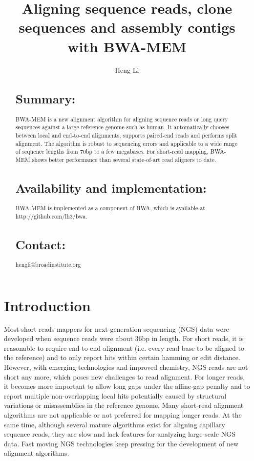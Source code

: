 \documentclass{bioinfo}
\begin{document}

\title{Aligning sequence reads, clone sequences and assembly contigs with BWA-MEM}

\author[Li]{Heng Li}

\address{Broad Institute of Harvard and MIT, 7 Cambridge Center, Cambridge, MA 02142, USA}

\maketitle

\begin{abstract}
\section{Summary:} BWA-MEM is a new alignment algorithm for aligning sequence
reads or long query sequences against a large reference genome such as human.
It automatically chooses between local and end-to-end alignments, supports
paired-end reads and performs split alignment. The algorithm is robust to
sequencing errors and applicable to a wide range of sequence lengths from 70bp
to a few megabases. For short-read mapping, BWA-MEM shows better performance
than several state-of-art read aligners to date.

\section{Availability and implementation:} BWA-MEM is implemented as a
component of BWA, which is available at http://github.com/lh3/bwa.

\section{Contact:} hengli@broadinstitute.org
\end{abstract}

\section{Introduction}

Most short-reads mappers for next-generation sequencing (NGS) data were
developed when sequence reads were about 36bp in length. For short reads, it is
reasonable to require end-to-end alignment (i.e. every read base to be aligned
to the reference) and to only report hits within certain hamming or edit
distance.  However, with emerging technologies and improved chemistry, NGS
reads are not short any more, which poses new challenges to read alignment. For
longer reads, it becomes more important to allow long gaps under the affine-gap
penalty and to report multiple non-overlapping local hits potentially caused by
structural variations or misassemblies in the reference genome. Many short-read
alignment algorithms are not applicable or not preferred for mapping longer
reads. At the same time, although several mature algorithms exist for aligning
capillary sequence reads, they are slow and lack features for analyzing
large-scale NGS data. Fast moving NGS technologies keep pressing for the
development of new alignment algorithms.
\end{document}
